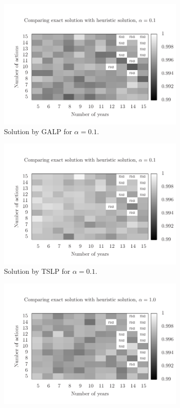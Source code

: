 \begin{figure}
\begin{subfigure}{0.45\textwidth}
    \includegraphics[scale=0.5, trim=0.75cm 0.55cm 0 2cm, clip=true]{imgs/comp_hard.pdf}
    \caption{Solution by GALP for $\alpha=0.1$.}
    \label{fig:mh1_2}
  \end{subfigure}
  \begin{subfigure}{0.45\textwidth}
    \includegraphics[scale=0.5, trim=0.75cm 0.55cm 0 2cm, clip=true]{imgs/comp_hard_ts.pdf}
    \caption{Solution by TSLP for $\alpha=0.1$.}
    \label{fig:mh2_2}
  \end{subfigure}
  \begin{subfigure}{0.45\textwidth}
    \includegraphics[scale=0.5, trim=0.75cm 0.55cm 0 2cm, clip=true]{imgs/comp_easy.pdf}

\end{subfigure}
\end{figure}
